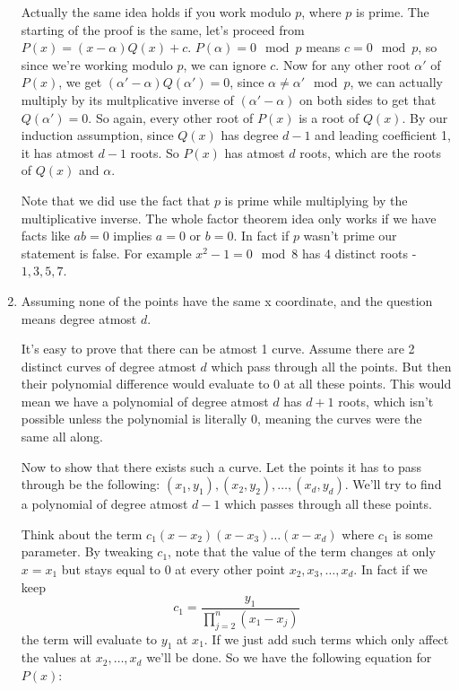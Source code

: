 \documentclass[12pt]{report}
\begin{document}
\begin{enumerate}[label=\textbf{\arabic*.}]
    Actually the same idea holds if you work modulo $p$, where $p$ is prime. The starting of the proof is the same, let's 
    proceed from $P(x) = (x - \alpha)Q(x) + c$. $P(\alpha) = 0 \mod p$ means $c = 0 \mod p$, so since we're working modulo $p$, 
    we can ignore $c$. Now for any other root $\alpha'$ of $P(x)$, we get $(\alpha' - \alpha)Q(\alpha') = 0$, since $\alpha 
    \neq \alpha' \mod p$, we can actually multiply by its multplicative inverse of $(\alpha' - \alpha)$ on both sides to get that 
    $Q(\alpha') = 0$. So again, every other root of $P(x)$ is a root of $Q(x)$. By our induction assumption, since $Q(x)$ 
    has degree $d-1$ and leading coefficient 1, it has atmost $d-1$ roots. So $P(x)$ has atmost $d$ roots, which are the roots 
    of $Q(x)$ and $\alpha$.

    Note that we did use the fact that $p$ is prime while multiplying by the multiplicative inverse. The whole factor theorem
    idea only works if we have facts like $ab = 0$ implies $a = 0$ or $b = 0$. In fact if $p$ wasn't prime our statement is 
    false. For example $x^2 - 1 = 0 \mod 8$ has 4 distinct roots - $1, 3, 5, 7$.

    \item Assuming none of the points have the same x coordinate, and the question means degree atmost $d$.
    
    It's easy to prove that there can be atmost 1 curve. Assume there are 2 distinct curves of degree atmost $d$ which pass through
    all the points. But then their polynomial difference would evaluate to 0 at all these points. This would mean we have a polynomial
    of degree atmost $d$ has $d+1$ roots, which isn't possible unless the polynomial is literally 0, meaning the curves were
    the same all along.

    Now to show that there exists such a curve. Let the points it has to pass through be the following:
    $(x_1, y_1), (x_2, y_2), \dots, (x_d, y_d)$. We'll try to find a polynomial of degree atmost $d-1$ which passes through all 
    these points.

    Think about the term $c_1(x - x_2)(x - x_3)\dots(x - x_d)$ where $c_1$ is some parameter. By tweaking $c_1$, note that the value 
    of the term changes at only $x = x_1$ but stays equal to 0 at every other point $x_2, x_3, \dots, x_d$. In fact if we keep 
    \[c_1  = \frac{y_1}{\prod_{j = 2}^n (x_1 - x_j)} \]
    the term will evaluate to $y_1$ at $x_1$. If we just add such terms which only affect the values at $x_2, \dots, x_d$ we'll be 
    done. So we have the following equation for $P(x)$:


\end{enumerate}
\end{document}
